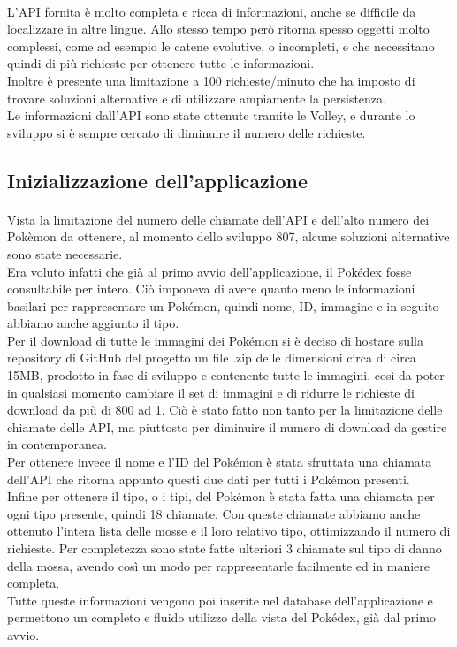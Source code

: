 \documentclass[a4paper,11pt]{article}
\begin{document}
  					\paragraph{}
  						L’API fornita è molto completa e ricca di informazioni, anche se difficile da localizzare in altre lingue. Allo stesso tempo però ritorna spesso oggetti molto complessi, come ad esempio le catene evolutive, o incompleti, e che necessitano quindi di più richieste per ottenere tutte le informazioni.\\
  						Inoltre è presente una limitazione a 100 richieste/minuto che ha imposto di trovare soluzioni alternative e di utilizzare ampiamente la persistenza.\\
  						Le informazioni dall’API sono state ottenute tramite le Volley, e durante lo sviluppo si è sempre cercato di diminuire il numero delle richieste.
  				\subsection{Inizializzazione dell'applicazione}
  					\paragraph{}
  						Vista la limitazione del numero delle chiamate dell’API e dell’alto numero dei Pokèmon da ottenere, al momento dello sviluppo 807, alcune soluzioni alternative sono state necessarie.\\
  						Era voluto infatti che già al primo avvio dell’applicazione, il Pokédex fosse consultabile per intero. Ciò imponeva di avere quanto meno le informazioni basilari per rappresentare un Pokémon, quindi nome, ID, immagine e in seguito abbiamo anche aggiunto il tipo.\\
  						Per il download di tutte le immagini dei Pokémon si è deciso di hostare sulla repository di GitHub del progetto un file .zip delle dimensioni circa di circa 15MB, prodotto in fase di sviluppo e contenente tutte le immagini, così da poter in qualsiasi momento cambiare il set di immagini e di ridurre le richieste di download da più di 800 ad 1. Ciò è stato fatto non tanto per la limitazione delle chiamate delle API, ma piuttosto per diminuire il numero di download da gestire in contemporanea.\\
  						Per ottenere invece il nome e l’ID del Pokémon è stata sfruttata una chiamata dell’API che ritorna appunto questi due dati per tutti i Pokémon presenti.\\
  						Infine per ottenere il tipo, o i tipi, del Pokémon è stata fatta una chiamata per ogni tipo presente, quindi 18 chiamate. Con queste chiamate abbiamo anche ottenuto l’intera lista delle mosse e il loro relativo tipo, ottimizzando il numero di richieste. Per completezza sono state fatte ulteriori 3 chiamate sul tipo di danno della mossa, avendo così un modo per rappresentarle facilmente ed in maniere completa.\\
  						Tutte queste informazioni vengono poi inserite nel database dell'applicazione e permettono un completo e fluido utilizzo della vista del Pokédex, già dal primo avvio.\\
\end{document}
